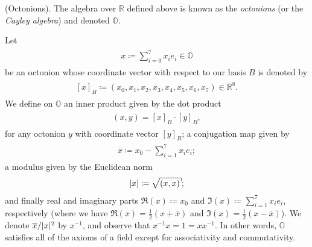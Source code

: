 \noindent\begin{definition}\textup{(Octonions).} The algebra over $\mathbb{R}$ defined above is known as the {\em octonions} (or the {\em Cayley algebra}) and denoted $\mathbb{O}$.\\
\end{definition}

\noindent Let
\begin{align*}
\begin{split}
x \coloneqq \sum_{i=0}^7{x_ie_i} \in \mathbb{O}
\end{split}
\end{align*}
\noindent be an octonion whose coordinate vector with respect to our basis $B$ is denoted by
\begin{align*}
\begin{split}
[x]_B \coloneqq (x_0, x_1, x_2, x_3, x_4, x_5, x_6, x_7) \in \mathbb{R}^8.
\end{split}
\end{align*}
\noindent We define on $\mathbb{O}$ an inner product given by the dot product
\begin{align*}
\begin{split}
(x, y) = [x]_B \cdot [y]_B,
\end{split}
\end{align*}
\noindent for any octonion $y$ with coordinate vector $[y]_B$; a conjugation map given by
\begin{align*}
\begin{split}
\overline{x} \coloneqq x_0 - \sum_{i=1}^7{x_ie_i};
\end{split}
\end{align*}
\noindent a modulus given by the Euclidean norm
\begin{align*}
\begin{split}
\abs{x} \coloneqq \csqrt{(x, x)};
\end{split}
\end{align*}
\noindent and finally real and imaginary parts $\mathfrak{R}(x) \coloneqq x_0$ and $\mathfrak{I}(x) \coloneqq \sum_{i=1}^7{x_ie_i}$, respectively (where we have $\mathfrak{R}(x) = \frac{1}{2}(x + \overline{x})$ and $\mathfrak{I}(x) = \frac{1}{2}(x - \overline{x})$). We denote $\overline{x}/\lvert x\rvert^2$ by $x^{-1}$, and observe that $x^{-1}x = 1 = xx^{-1}$. In other words, $\mathbb{O}$ satisfies all of the axioms of a field except for associativity and commutativity.\newpage

